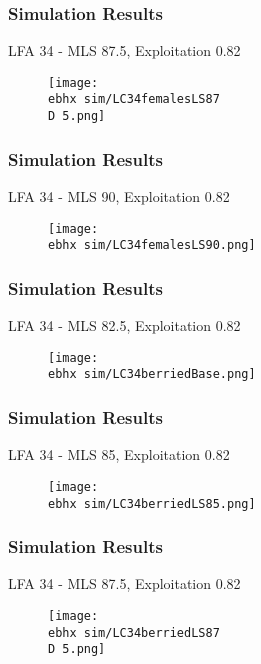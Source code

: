 \documentclass{beamer}
\newcommand{\ebhx}{\string~/bio.data/bio.lobster/figures/LFA3438Framework2019/figures/Brad/} %
\newcommand{\D}{.}
\begin{document}
\begin{frame}
\frametitle{Simulation Results}
LFA 34 - MLS 87.5, Exploitation 0.82
\begin{figure}
        \begin{center}
            \texttt{[image: \\ebhx sim/LC34femalesLS87\\D 5.png]}
        \end{center}
    \end{figure}
\end{frame}


\begin{frame}
\frametitle{Simulation Results}
LFA 34 - MLS 90, Exploitation 0.82
\begin{figure}
        \begin{center}
            \texttt{[image: \\ebhx sim/LC34femalesLS90.png]}
        \end{center}
    \end{figure}
\end{frame}




\begin{frame}
\frametitle{Simulation Results}
LFA 34 - MLS 82.5, Exploitation 0.82
\begin{figure}
        \begin{center}
            \texttt{[image: \\ebhx sim/LC34berriedBase.png]}
        \end{center}
    \end{figure}
\end{frame}



\begin{frame}
\frametitle{Simulation Results}
LFA 34 - MLS 85, Exploitation 0.82
\begin{figure}
        \begin{center}
            \texttt{[image: \\ebhx sim/LC34berriedLS85.png]}
        \end{center}
    \end{figure}
\end{frame}


\begin{frame}
\frametitle{Simulation Results}
LFA 34 - MLS 87.5, Exploitation 0.82
\begin{figure}
        \begin{center}
            \texttt{[image: \\ebhx sim/LC34berriedLS87\\D 5.png]}
        \end{center}
    \end{figure}
\end{frame}
\end{document}
